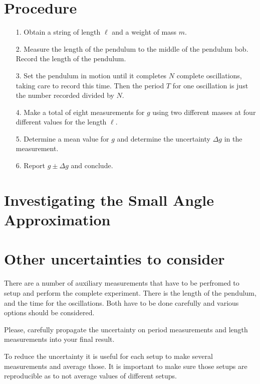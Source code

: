 \documentclass[10pt,aps,twocolumn,secnumarabic,balancelastpage,amsmath,amssymb,nofootinbib,floatfix]{revtex4}
\begin{document}
\section{Procedure}

\begin{itemize}
\item[1.] Obtain a string of length $\ell$ and a weight of mass $m$.
\item[2.] Measure the length of the pendulum to the middle of the pendulum bob.  Record the length of the pendulum.
\item[3.] Set the pendulum in motion until it completes $N$ complete oscillations, taking care to record this time. Then the period $T$ for one oscillation is just the number recorded divided by $N$.
\item[4.] Make a total of eight measurements for $g$ using two different masses at four different values for the length $\ell$.
\item[5.] Determine a mean value for $g$ and determine the uncertainty $\Delta g$ in the measurement.
\item[6.] Report $g \pm \Delta g$ and conclude.
\end{itemize}

\section{Investigating the Small Angle Approximation}


\section{Other uncertainties to consider}

There are a number of auxiliary measurements that have to be perfromed to setup and perform the complete experiment. There is the length of the pendulum, and the time for the
oscillations. Both have to be done carefully and various options should be considered.

Please, carefully propagate the uncertainty on period measurements and length measurements into your final result.

To reduce the uncertainty it is useful for each setup to make several measurements and average those. It is important to make sure those setups are reproducible as to not average values of different setups.
\end{document}
